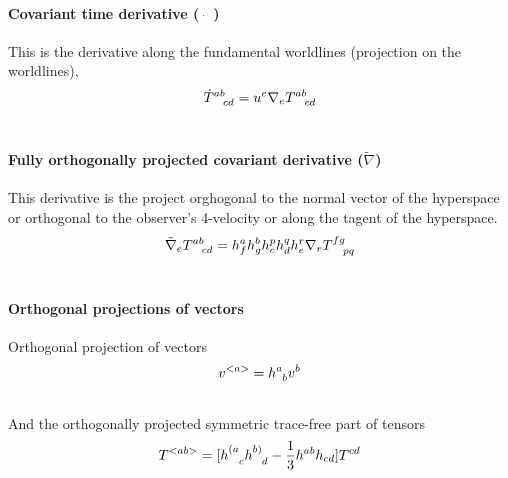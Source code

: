 \documentclass[letterpaper,10pt,english]{sphinxmanual}
\begin{document}
\paragraph{Covariant time derivative ($\dot \quad$)}
\label{relativity/GeneralRelativity:covariant-time-derivative}
This is the derivative along the fundamental worldlines (projection on the worldlines),
\begin{gather}
\begin{split}\dot T^{ab}_{\phantom{ab}cd} = u^e \nabla_e T^{ab}_{\phantom{ab}cd}\end{split}\notag\\\begin{split}\end{split}\notag
\end{gather}

\paragraph{Fully orthogonally projected covariant derivative ($\tilde \nabla$)}
\label{relativity/GeneralRelativity:fully-orthogonally-projected-covariant-derivative}
This derivative is the project orghogonal to the normal vector of the hyperspace or orthogonal to the observer's 4-velocity or along the tagent of the hyperspace.
\begin{gather}
\begin{split}\tilde\nabla_e T^{ab}_{\phantom{ab}cd} = h^a_f h^b_gh^p_ch^q_dh^r_e \nabla_r T^{fg}_{\phantom{fg}pq}\end{split}\notag\\\begin{split}\end{split}\notag
\end{gather}

\paragraph{Orthogonal projections of vectors}
\label{relativity/GeneralRelativity:orthogonal-projections-of-vectors}
Orthogonal projection of vectors
\begin{gather}
\begin{split}v^{<a>}      = h^a_{\phantom a b} v^b\end{split}\notag\\\begin{split}\end{split}\notag
\end{gather}
And the orthogonally projected symmetric trace-free part of tensors
\begin{gather}
\begin{split}T^{<ab>} = [h^{(a}_{\phantom {(a} c} h^{b)}_{\phantom{b)}d} - \frac{1}{3} h^{ab} h_{cd} ] T^{cd}\end{split}\notag\\\begin{split}\end{split}\notag
\end{gather}
\end{document}

